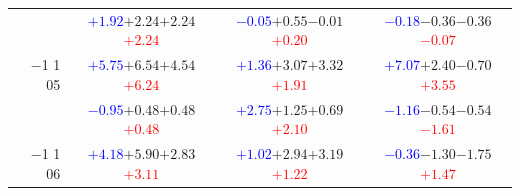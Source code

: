 \documentclass[compress]{beamer}
\begin{document}
\begin{frame}
\begin{tabular}{r | c | c | c}
          & \textcolor{blue}{$+1.92$}\hspace{0.1 cm}$+2.24$\hspace{0.1 cm}$+2.24$\hspace{0.1 cm}\textcolor{red}{$+2.24$} & \textcolor{blue}{$-0.05$}\hspace{0.1 cm}$+0.55$\hspace{0.1 cm}$-0.01$\hspace{0.1 cm}\textcolor{red}{$+0.20$} & \textcolor{blue}{$-0.18$}\hspace{0.1 cm}$-0.36$\hspace{0.1 cm}$-0.36$\hspace{0.1 cm}\textcolor{red}{$-0.07$} \\
$-$1 1 05 & \textcolor{blue}{$+5.75$}\hspace{0.1 cm}$+6.54$\hspace{0.1 cm}$+4.54$\hspace{0.1 cm}\textcolor{red}{$+6.24$} & \textcolor{blue}{$+1.36$}\hspace{0.1 cm}$+3.07$\hspace{0.1 cm}$+3.32$\hspace{0.1 cm}\textcolor{red}{$+1.91$} & \textcolor{blue}{$+7.07$}\hspace{0.1 cm}$+2.40$\hspace{0.1 cm}$-0.70$\hspace{0.1 cm}\textcolor{red}{$+3.55$} \\
          & \textcolor{blue}{$-0.95$}\hspace{0.1 cm}$+0.48$\hspace{0.1 cm}$+0.48$\hspace{0.1 cm}\textcolor{red}{$+0.48$} & \textcolor{blue}{$+2.75$}\hspace{0.1 cm}$+1.25$\hspace{0.1 cm}$+0.69$\hspace{0.1 cm}\textcolor{red}{$+2.10$} & \textcolor{blue}{$-1.16$}\hspace{0.1 cm}$-0.54$\hspace{0.1 cm}$-0.54$\hspace{0.1 cm}\textcolor{red}{$-1.61$} \\
$-$1 1 06 & \textcolor{blue}{$+4.18$}\hspace{0.1 cm}$+5.90$\hspace{0.1 cm}$+2.83$\hspace{0.1 cm}\textcolor{red}{$+3.11$} & \textcolor{blue}{$+1.02$}\hspace{0.1 cm}$+2.94$\hspace{0.1 cm}$+3.19$\hspace{0.1 cm}\textcolor{red}{$+1.22$} & \textcolor{blue}{$-0.36$}\hspace{0.1 cm}$-1.30$\hspace{0.1 cm}$-1.75$\hspace{0.1 cm}\textcolor{red}{$+1.47$} \\

\end{tabular}
\end{frame}
\end{document}
